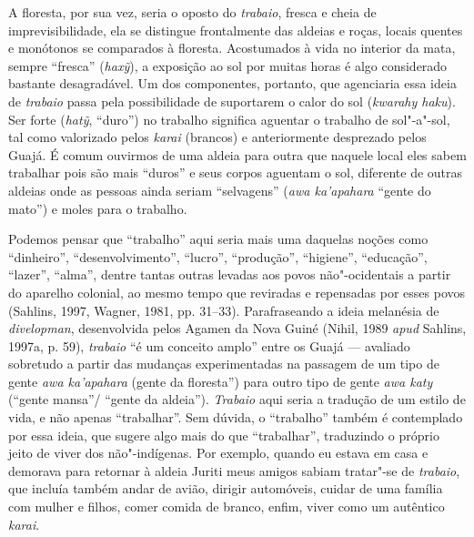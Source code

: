 A floresta, por sua vez, seria o oposto do \emph{trabaio}, fresca e
cheia de imprevisibilidade, ela se distingue frontalmente das aldeias e
roças, locais quentes e monótonos se comparados à floresta. Acostumados
à vida no interior da mata, sempre ``fresca'' (\emph{haxỹ}), a
exposição ao sol por muitas horas é algo considerado bastante
desagradável. Um dos componentes, portanto, que agenciaria essa ideia de
\emph{trabaio} passa pela possibilidade de suportarem o calor do sol
(\emph{kwarahy haku}). Ser forte (\emph{hatỹ}, ``duro'') no trabalho
significa aguentar o trabalho de sol"-a"-sol, tal como valorizado pelos
\emph{karai} (brancos) e anteriormente desprezado pelos Guajá. É comum
ouvirmos de uma aldeia para outra que naquele local eles sabem trabalhar
pois são mais ``duros'' e seus corpos aguentam o sol, diferente de
outras aldeias onde as pessoas ainda seriam ``selvagens'' (\emph{awa
ka'apahara} ``gente do mato'') e moles para o trabalho.

Podemos pensar que ``trabalho'' aqui seria mais uma daquelas noções como
``dinheiro'', ``desenvolvimento'', ``lucro'', ``produção'', ``higiene'',
``educação'', ``lazer'', ``alma'', dentre tantas outras levadas aos
povos não"-ocidentais a partir do aparelho colonial, ao mesmo tempo que
reviradas e repensadas por esses povos (Sahlins, 1997, Wagner, 1981, pp.
31--33). Parafraseando a ideia melanésia de \emph{divelopman},
desenvolvida pelos Agamen da Nova Guiné (Nihil, 1989 \emph{apud} Sahlins, 1997a,
p. 59), \emph{trabaio} ``é um conceito amplo'' entre os Guajá --- avaliado
sobretudo a partir das mudanças experimentadas na passagem de um tipo de
gente \emph{awa ka'apahara} (gente da floresta'') para outro tipo de
gente \emph{awa katy} (``gente mansa''/ ``gente da aldeia'').
\emph{Trabaio} aqui seria a tradução de um estilo de vida, e não apenas
``trabalhar''. Sem dúvida, o ``trabalho'' também é contemplado por essa
ideia, que sugere algo mais do que ``trabalhar'', traduzindo o próprio
jeito de viver dos não"-indígenas. Por exemplo, quando eu estava em casa
e demorava para retornar à aldeia Juriti meus amigos sabiam tratar"-se de
\emph{trabaio}, que incluía também andar de avião, dirigir automóveis,
cuidar de uma família com mulher e filhos, comer comida de branco,
enfim, viver como um autêntico \emph{karai}.

